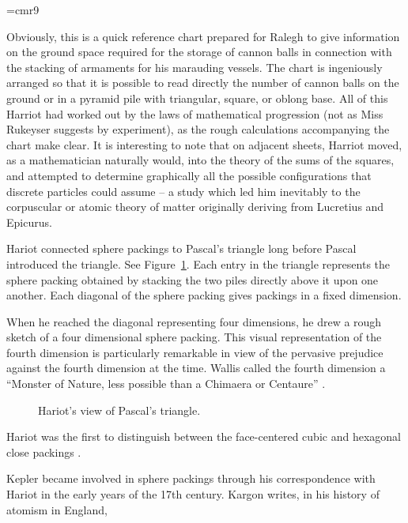 {
\narrower
\font\ninerm=cmr9
\ninerm

    Obviously, this is a quick reference chart prepared for Ralegh to give information on the ground space required for the storage of cannon
    balls in connection with the stacking of armaments for his marauding vessels. The chart is ingeniously arranged so that it is possible to
    read directly the number of cannon balls on the ground or in a pyramid pile with triangular, square, or oblong base. All of this Harriot had
    worked out by the laws of mathematical progression (not as Miss Rukeyser suggests by experiment), as the rough calculations
    accompanying the chart make clear. It is interesting to note that on adjacent sheets, Harriot moved, as a mathematician naturally would,
    into the theory of the sums of the squares, and attempted to determine graphically all the possible configurations that discrete particles
    could assume -- a study which led him inevitably to the corpuscular or atomic theory of matter originally deriving from Lucretius and
    Epicurus. \cite[p.242]{Shi83}

}

\smallskip
Hariot connected sphere packings to Pascal's triangle long before
Pascal introduced the triangle. See Figure~\ref{fig:pascal}.  Each entry in the triangle represents the sphere packing obtained
by stacking the two piles directly above it upon one another.  Each
diagonal of the sphere packing gives packings in a fixed dimension.

When he reached the diagonal representing four dimensions, he drew a
rough sketch of a four dimensional sphere packing.
This visual representation of the fourth dimension is particularly
remarkable in view of the pervasive prejudice against the fourth dimension
at the time.  Wallis called the fourth dimension a ``Monster of Nature, less possible than a Chimaera or Centaure'' 
\cite{Ban}.

\begin{figure}[htb]
  \centering
  \caption{Hariot's view of Pascal's triangle.}
  \label{fig:pascal}
\end{figure}

Hariot was the first to distinguish between the face-centered
cubic and hexagonal close packings \cite[p.52]{Mas66}.

Kepler 
became involved in sphere packings through his correspondence
with Hariot in the early years of the 17th century.
Kargon writes, in his history of atomism in England,


